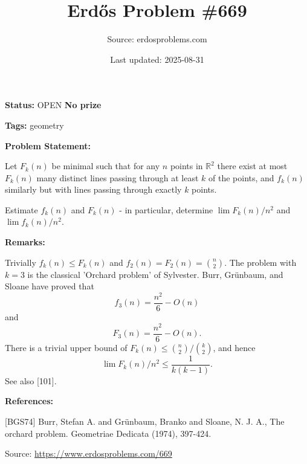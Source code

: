 \documentclass{article}
\title{Erd\H{o}s Problem \#669}
\date{Last updated: 2025-08-31}
\author{Source: erdosproblems.com}
\begin{document}
\maketitle

\noindent\textbf{Status:} OPEN \quad \textbf{No prize}

\noindent\textbf{Tags:} geometry

\medskip
\noindent\textbf{Problem Statement:}

Let $F_k(n)$ be minimal such that for any $n$ points in $\mathbb{R}^2$ there exist at most $F_k(n)$ many distinct lines passing through at least $k$ of the points, and $f_k(n)$ similarly but with lines passing through exactly $k$ points.

Estimate $f_k(n)$ and $F_k(n)$ - in particular, determine $\lim F_k(n)/n^2$ and $\lim f_k(n)/n^2$.

\bigskip
\noindent\textbf{Remarks:}

Trivially $f_k(n)\leq F_k(n)$ and $f_2(n)=F_2(n)=\binom{n}{2}$. The problem with $k=3$ is the classical 'Orchard problem' of Sylvester. Burr, Gr\"{u}nbaum, and Sloane \cite{BGS74} have proved that\[f_3(n)=\frac{n^2}{6}-O(n)\]and\[F_3(n)=\frac{n^2}{6}-O(n).\]There is a trivial upper bound of $F_k(n) \leq \binom{n}{2}/\binom{k}{2}$, and hence\[\lim F_k(n)/n^2 \leq \frac{1}{k(k-1)}.\]See also [101].

\bigskip
\noindent\textbf{References:}

[BGS74] Burr, Stefan A. and Gr\"{u}nbaum, Branko and Sloane, N. J. A., The orchard problem. Geometriae Dedicata (1974), 397-424.

\bigskip
\noindent\small{Source: \url{https://www.erdosproblems.com/669}}
\end{document}
